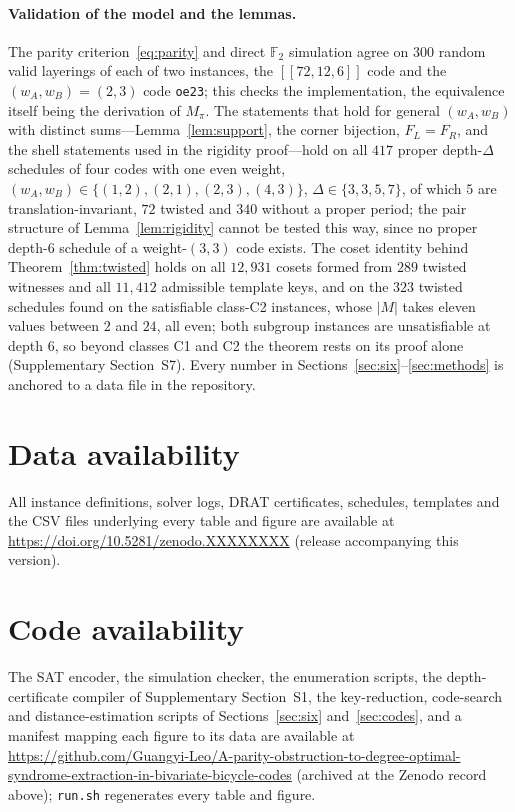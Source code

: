 \documentclass[reprint,twocolumn,superscriptaddress,nofootinbib]{revtex4-2}
\theoremstyle{plain}
\newcommand{\F}{\mathbb{F}_2}
\newcommand{\wA}{w_A}                  %
\newcommand{\wB}{w_B}
\begin{document}
\paragraph*{Validation of the model and the lemmas.}
The parity criterion~\eqref{eq:parity} and direct $\F$ simulation agree on
$300$ random valid layerings of each of two instances, the $[[72,12,6]]$
code and the $(\wA,\wB)=(2,3)$ code \texttt{oe23}; this checks the
implementation, the equivalence itself being the derivation of $M_\pi$.
The statements that hold for general $(\wA,\wB)$ with distinct
sums---Lemma~\ref{lem:support}, the corner bijection, $F_L=F_R$, and the
shell statements used in the rigidity proof---hold on all $417$ proper
depth-$\Delta$ schedules of four codes with one even weight,
$(\wA,\wB)\in\{(1,2),(2,1),(2,3),(4,3)\}$, $\Delta\in\{3,3,5,7\}$, of which
$5$ are translation-invariant, $72$ twisted and $340$ without a proper
period; the pair structure of Lemma~\ref{lem:rigidity} cannot be tested
this way, since no proper depth-$6$ schedule of a weight-$(3,3)$ code
exists. The coset identity behind Theorem~\ref{thm:twisted} holds on all
$12{,}931$ cosets formed from $289$ twisted witnesses and all $11{,}412$
admissible template keys, and on the $323$ twisted schedules found on the
satisfiable class-C2 instances, whose $|M|$ takes eleven values between
$2$ and $24$, all even; both subgroup instances are unsatisfiable at depth
$6$, so beyond classes C1 and C2 the theorem rests on its proof alone
(Supplementary Section~S7). Every number in
Sections~\ref{sec:six}--\ref{sec:methods} is anchored to a data file in
the repository.

\section*{Data availability}
All instance definitions, solver logs, DRAT certificates, schedules,
templates and the CSV files underlying every table and figure are
available at \url{https://doi.org/10.5281/zenodo.XXXXXXXX} (release
accompanying this version).

\section*{Code availability}
The SAT encoder, the simulation checker, the enumeration scripts, the
depth-certificate compiler of Supplementary Section~S1, the key-reduction,
code-search and distance-estimation scripts of Sections~\ref{sec:six}
and~\ref{sec:codes}, and a manifest mapping each figure to its data are
available at \url{https://github.com/Guangyi-Leo/A-parity-obstruction-to-degree-optimal-syndrome-extraction-in-bivariate-bicycle-codes}
(archived at
the Zenodo record above); \texttt{run.sh} regenerates every table and
figure.
\end{document}
